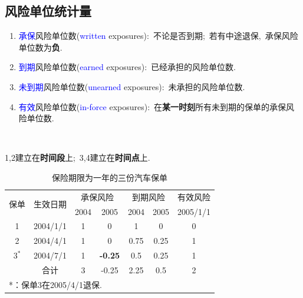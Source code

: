 \documentclass[professionalfont]{beamer}
\newcommand{\green}[1]{\textbf{#1}}
\newcommand{\blue}[1]{\textcolor{blue}{#1}}
\begin{document}
\subsection{风险单位统计量}
	\begin{frame}{}
		\begin{enumerate}
	\item \blue{承保}风险单位数(\blue{written} exposures):~不论是否到期;~若有中途退保,~承保风险单位数为\green{负}.
	\item \blue{到期}风险单位数(\blue{earned} exposures):~已经承担的风险单位数.
	\item \blue{未到期}风险单位数(\blue{unearned} exposures):~未承担的风险单位数.
	\item \blue{有效}风险单位数(\blue{in-force} exposures):~在\green{某一时刻}所有未到期的保单的承保风险单位数.

		\end{enumerate}
	
	~
	
	1,2建立在\green{时间段}上;~3,4建立在\green{时间点}上.
	\end{frame}
\begin{frame}
	\begin{table}[]
		\centering
		\caption{保险期限为一年的三份汽车保单}
		\label{my-label}
		\begin{tabular}{ccccccc}
			\hline
			\multirow{2}{*}{保单} & \multirow{2}{*}{生效日期} & \multicolumn{2}{c}{承保风险} & \multicolumn{2}{c}{到期风险} & 有效风险     \\ \cline{3-7} 
			&                       & 2004       & 2005        & 2004        & 2005       & 2005/1/1 \\ \hline
			1                   & 2004/1/1              & 1          & 0           & 1           & 0          & 0        \\
			2                   & 2004/4/1              & 1          & 0           & 0.75        & 0.25       & 1        \\
			$3^*$               & 2004/7/1              & 1          &\green{-0.25}       & 0.5         & 0.25       & 1        \\
			& 合计                    & 3          & -0.25       & 2.25        & 0.5        & 2        \\ \hline
			\multicolumn{7}{l}{*：保单3在2005/4/1退保.}                                               \\ \hline
		\end{tabular}
	\end{table}
\end{frame}	
\end{document}
